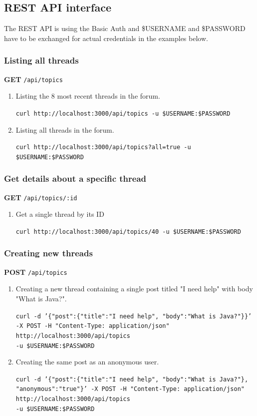 \documentclass[a4paper, 11pt, titlepage]{article}
\begin{document}
\subsection{REST API interface}
The REST API is using the Basic Auth and \$USERNAME and \$PASSWORD have to be exchanged for actual credentials in the examples below.

\subsubsection{Listing all threads}

\textbf{GET} \texttt{/api/topics}
\begin{enumerate}
  \item Listing the 8 most recent threads in the forum.

    \texttt{curl http://localhost:3000/api/topics -u \$USERNAME:\$PASSWORD}
  \item Listing all threads in the forum.

    \texttt{curl http://localhost:3000/api/topics?all=true -u \$USERNAME:\$PASSWORD}
\end{enumerate}

\subsubsection{Get details about a specific thread}

\textbf{GET} \texttt{/api/topics/:id}
\begin{enumerate}
  \item Get a single thread by its ID

    \texttt{curl http://localhost:3000/api/topics/40 -u \$USERNAME:\$PASSWORD}
\end{enumerate}

\subsubsection{Creating new threads}

\textbf{POST} \texttt{/api/topics}

\begin{enumerate}
  \item Creating a new thread containing a single post titled "I need help" with body "What is Java?".

    \texttt{curl -d '\{"post":\{"title":"I need help", "body":"What is Java?"\}\}' -X POST -H "Content-Type: application/json" http://localhost:3000/api/topics}\\ \texttt{-u \$USERNAME:\$PASSWORD}
  \item Creating the same post as an anonymous user.

    \texttt{curl -d '\{"post":\{"title":"I need help", "body":"What is Java?"\}, "anonymous":"true"\}' -X POST -H "Content-Type: application/json" http://localhost:3000/api/topics}\\ \texttt{-u \$USERNAME:\$PASSWORD}
\end{enumerate}
\end{document}
